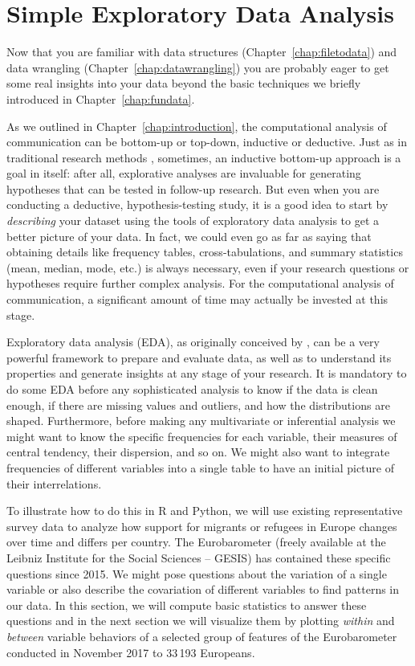 %
\section{Simple Exploratory Data Analysis}
\label{sec:simpleeda}

Now that you are familiar with data structures (Chapter~\ref{chap:filetodata}) and data wrangling (Chapter~\ref{chap:datawrangling}) you are probably eager to get some real insights into your data beyond the basic techniques we briefly introduced in Chapter~\ref{chap:fundata}.

As we outlined in Chapter~\ref{chap:introduction}, the computational analysis
of communication can be  bottom-up or top-down, inductive or
deductive.  Just as in traditional research methods \cite[for an
  overview, see, for example,][]{Bryman2012}, sometimes, an inductive
bottom-up approach is a goal in itself: after all, explorative
analyses are invaluable for generating hypotheses that can be tested
in follow-up research. But even when you are conducting a deductive,
hypothesis-testing study, it is a good idea to start by
\emph{describing} your dataset using the tools of exploratory data
analysis to get a better picture of your data. In fact, we could even
go as far as saying that obtaining details like frequency tables,
cross-tabulations, and summary statistics (mean, median, mode, etc.)
is always necessary, even if your research questions or hypotheses
require further complex analysis. For the computational analysis of
communication, a significant amount of time may actually be invested
at this stage.

Exploratory data analysis (EDA), as originally conceived by \citet{tukey1977exploratory}, can be a very powerful framework to prepare and evaluate data, as well as to understand its properties and generate insights at any stage of your research.
It is mandatory to do some EDA before any sophisticated analysis to know if the data is clean enough, if there are missing values and outliers, and how the distributions are shaped.
Furthermore, before making any multivariate or inferential analysis we might want to know the specific frequencies for each variable, their measures of central tendency, their dispersion, and so on. We might also want to integrate frequencies of different variables into a single table to have an initial picture of their interrelations.

To illustrate how to do this in R and Python, we will use existing representative survey data to analyze how support for migrants or refugees in Europe changes over time and differs per country.
 The Eurobarometer (freely available at the Leibniz Institute for the Social Sciences -- GESIS) has contained these specific questions since 2015. We might pose questions about the variation of a single variable or also describe the covariation of different variables to find patterns in our data. In this section, we will compute basic statistics to answer  these questions and in the next section we will visualize them by plotting \textit{within} and \textit{between} variable behaviors of a selected group of features of the Eurobarometer conducted in November 2017 to 33\,193 Europeans.


